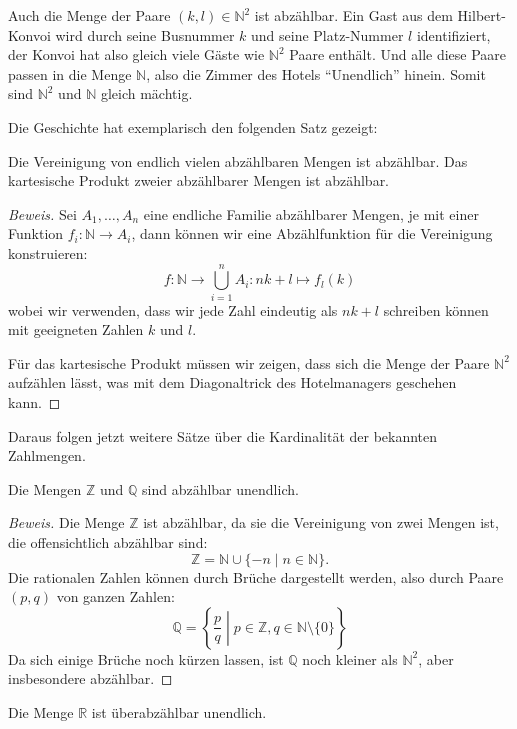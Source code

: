 Auch die Menge der Paare $(k,l)\in \mathbb N^2$ ist abzählbar.
Ein Gast aus dem Hilbert-Konvoi wird durch seine Busnummer $k$ und
seine Platz-Nummer $l$ identifiziert, der Konvoi hat also gleich
viele Gäste wie $\mathbb N^2$ Paare enthält. Und alle diese Paare
passen in die Menge $\mathbb N$, also die Zimmer des Hotels ``Unendlich''
hinein. Somit sind $\mathbb N^2$ und $\mathbb N$ gleich mächtig.

Die Geschichte hat exemplarisch den folgenden Satz gezeigt:

\begin{satz}Die Vereinigung von endlich vielen abzählbaren
Mengen ist abzählbar. Das kartesische Produkt zweier abzählbarer
Mengen ist abzählbar.
\end{satz}

\begin{proof}[Beweis]
Sei $A_1,\dots,A_n$ eine endliche Familie abzählbarer Mengen,
je mit einer Funktion $f_i\colon \mathbb N\to A_i$, dann
können wir eine Abzählfunktion für die Vereinigung konstruieren:
\[
f\colon \mathbb N\to\bigcup_{i=1}^n A_i\colon nk+l \mapsto f_l(k)
\]
wobei wir verwenden, dass wir jede Zahl eindeutig als $nk+l$
schreiben können mit geeigneten Zahlen $k$ und $l$.

Für das kartesische Produkt müssen wir zeigen, dass sich die
Menge der Paare $\mathbb N^2$ aufzählen lässt, was mit dem
Diagonaltrick des Hotelmanagers geschehen kann.
\end{proof}

Daraus folgen jetzt weitere Sätze über die Kardinalität
der bekannten Zahlmengen.

\begin{satz}
Die Mengen $\mathbb Z$ und $\mathbb Q$ sind abzählbar unendlich.
\end{satz}

\begin{proof}[Beweis]
Die Menge $\mathbb Z$ ist abzählbar, da sie die Vereinigung
von zwei Mengen ist, die offensichtlich abzählbar sind:
\[
\mathbb Z = \mathbb N\cup \{-n\;|\;n\in\mathbb N\}.
\]
Die rationalen Zahlen können durch Brüche dargestellt werden,
also durch Paare $(p,q)$ von ganzen Zahlen:
\[
\mathbb Q=\left\{\left.\frac{p}{q}\;\right|\;p\in \mathbb Z,q\in\mathbb N\setminus\{0\}\right\}
\]
Da sich einige Brüche noch kürzen lassen, ist $\mathbb Q$ noch
kleiner als $\mathbb N^2$, aber insbesondere abzählbar.
\end{proof}

\begin{satz}
Die Menge $\mathbb R$ ist überabzählbar unendlich.
\end{satz}

